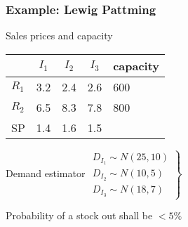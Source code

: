 \begin{frame}
 \frametitle{Example: Lewig Pattming}
 \begin{block}{Sales prices and capacity}
  \begin{center}\upshape
    \begin{tabular}{lccc@{\qquad}l}
    \toprule
      & $I_1$ & $I_2$ & $I_3$ & capacity\\
    \midrule 
      $R_1$ & 3.2 & 2.4 & 2.6 & 600 \\
      $R_2$ & 6.5 & 8.3 & 7.8 & 800 \\
    \midrule
      SP & 1.4 & 1.6 & 1.5 & \\
    \bottomrule
    \end{tabular}
  \end{center}
 \end{block}
 \begin{block}{Demand estimator}
  $\left.\begin{array}{l}
   D_{I_1} \sim N(25, 10)\\
   D_{I_2} \sim N(10, 5)\\
   D_{I_3} \sim N(18, 7)
  \end{array}\right\}$
  \begin{minipage}[m]{.6\linewidth}
   \raggedright
   Probability of a stock out shall be  $<5\%$ 
  \end{minipage}
 \end{block}
\end{frame}

